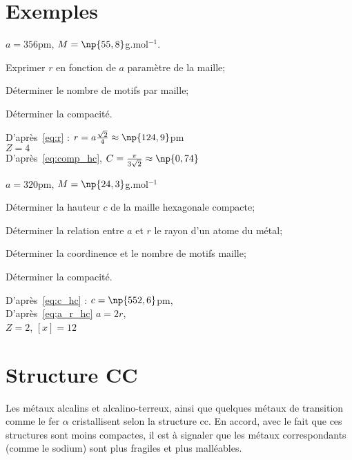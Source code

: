 \section{Exemples}
\begin{ex}
    $a = 356$pm,
    $M = \np{55,8}$g.mol$^{-1}$.
    \begin{compactitem}
        \item Exprimer $r$ en fonction de $a$ paramètre
            de la maille;
        \item Déterminer le nombre de motifs par maille;
        \item Déterminer la compacité.
    \end{compactitem}
    D'après~\ref{eq:r} : $r = a\frac{\sqrt{2}}{4} \approx \np{124,9}$pm\\
    $Z = 4$\\
    D'après~\ref{eq:comp_hc}, $C = \frac{\pi}{3\sqrt{2}} \approx \np{0,74}$
\end{ex}
\begin{ex}
    $a = 320$pm,
    $M = \np{24,3}$g.mol$^{-1}$
    \begin{compactitem}
        \item Déterminer la hauteur $c$ de la maille hexagonale
            compacte;
        \item Déterminer la relation entre $a$ et $r$ le rayon
            d'un atome du métal;
        \item Déterminer la coordinence et le nombre de motifs
            maille;
        \item Déterminer la compacité.
    \end{compactitem}
    D'après~\ref{eq:c_hc} : $c = \np{552,6}$pm,\\
    D'après~\ref{eq;a_r_hc} $a = 2r$,\\
    $Z = 2$, $[x] = 12$
\end{ex}



\section{Structure CC}
Les métaux alcalins et alcalino-terreux, ainsi que quelques
métaux de transition comme le fer $\alpha$ cristallisent selon la structure cc.
En accord, avec le fait que ces structures sont moins compactes,
il est à signaler que les métaux correspondants (comme le sodium) sont
plus fragiles et plus malléables.

